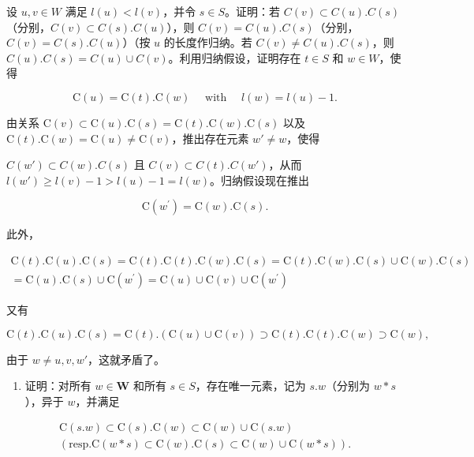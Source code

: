   设 \(u, v \in W\) 满足 \(l(u) < l(v)\)，并令 \(s \in S\)。证明：若 \(C(v) \subset C(u).C(s)\)（分别，\(C(v) \subset C(s).C(u)\)），则 \(C(v) = C(u).C(s)\)（分别，\(C(v) = C(s).C(u)\)）（按 \(u\) 的长度作归纳。若 \(C(v) \neq C(u).C(s)\)，则 \(C(u).C(s) = C(u) \cup C(v)\)。利用归纳假设，证明存在 \(t \in S\) 和 \(w \in W\)，使得

\[
\mathrm{C} (u) = \mathrm{C} (t). \mathrm{C} (w) \quad \text { with } \quad l (w) = l (u) - 1.
\]

由关系 \(\mathrm{C}(v) \subset \mathrm{C}(u).\mathrm{C}(s) = \mathrm{C}(t).\mathrm{C}(w).\mathrm{C}(s)\) 以及 \(\mathrm{C}(t).\mathrm{C}(w) = \mathrm{C}(u) \neq \mathrm{C}(v)\)，推出存在元素 \(w' \neq w\)，使得

\(C(w') \subset C(w).C(s)\) 且 \(C(v) \subset C(t).C(w')\)，从而 \(l(w') \geqslant l(v) - 1 > l(u) - 1 = l(w)\)。归纳假设现在推出

\[
\mathrm{C} (w ^ {\prime}) = \mathrm{C} (w). \mathrm{C} (s).
\]

此外，

\[
\begin{array}{c} \mathrm{C} (t). \mathrm{C} (u). \mathrm{C} (s) = \mathrm{C} (t). \mathrm{C} (t). \mathrm{C} (w). \mathrm{C} (s) = \mathrm{C} (t). \mathrm{C} (w). \mathrm{C} (s) \cup \mathrm{C} (w). \mathrm{C} (s) \\ = \mathrm{C} (u). \mathrm{C} (s) \cup \mathrm{C} (w ^ {\prime}) = \mathrm{C} (u) \cup \mathrm{C} (v) \cup \mathrm{C} (w ^ {\prime}) \end{array}
\]

又有

\[
\mathrm{C} (t). \mathrm{C} (u). \mathrm{C} (s) = \mathrm{C} (t). (\mathrm{C} (u) \cup \mathrm{C} (v)) \supset \mathrm{C} (t). \mathrm{C} (t). \mathrm{C} (w) \supset \mathrm{C} (w),
\]

由于 \(w \neq u, v, w'\)，这就矛盾了。

\begin{enumerate}
\def\labelenumi{\alph{enumi})}
\setcounter{enumi}{2}
\tightlist
\item
  证明：对所有 \(w \in \mathbf{W}\) 和所有 \(s \in S\)，存在唯一元素，记为 \(s.w\)（分别为 \(w * s\)），异于 \(w\)，并满足
\end{enumerate}

\[
\begin{array}{c} \mathrm{C} (s. w) \subset \mathrm{C} (s). \mathrm{C} (w) \subset \mathrm{C} (w) \cup \mathrm{C} (s. w) \\ (\text {resp.} \mathrm{C} (w * s) \subset \mathrm{C} (w). \mathrm{C} (s) \subset \mathrm{C} (w) \cup \mathrm{C} (w * s)). \end{array}
\]

